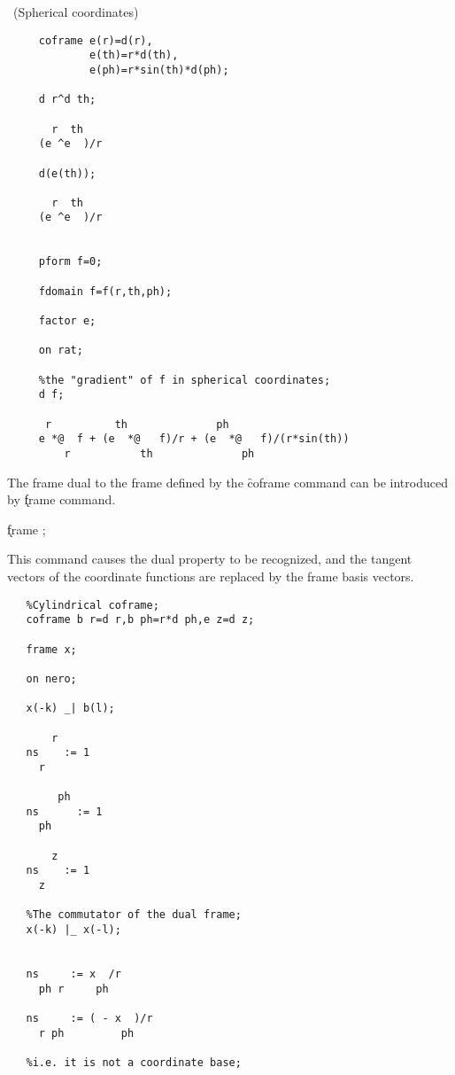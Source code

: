 \example\ (Spherical coordinates)

\begin{verbatim}
     coframe e(r)=d(r),
             e(th)=r*d(th),
             e(ph)=r*sin(th)*d(ph);

     d r^d th;

       r  th
     (e ^e  )/r

     d(e(th));

       r  th
     (e ^e  )/r


     pform f=0;

     fdomain f=f(r,th,ph);

     factor e;

     on rat;

     %the "gradient" of f in spherical coordinates;
     d f;

      r          th              ph
     e *@  f + (e  *@   f)/r + (e  *@   f)/(r*sin(th))
         r           th              ph
\end{verbatim}

The frame dual to the frame defined by the \f{coframe} command can
be introduced by \k{frame} command. 
\hypertarget{command:FRAME}{}

\hspace*{2em} \k{frame} ;\label{FRAME}

This command causes the
dual property to be recognized, and the tangent vectors of the
coordinate functions are replaced by the frame basis vectors.

\example{}

\begin{verbatim}
   %Cylindrical coframe;
   coframe b r=d r,b ph=r*d ph,e z=d z;

   frame x;

   on nero;

   x(-k) _| b(l);

       r
   ns    := 1
     r

        ph
   ns      := 1
     ph

       z
   ns    := 1
     z

   %The commutator of the dual frame;
   x(-k) |_ x(-l);


   ns     := x  /r
     ph r     ph

   ns     := ( - x  )/r
     r ph         ph

   %i.e. it is not a coordinate base;
\end{verbatim}

